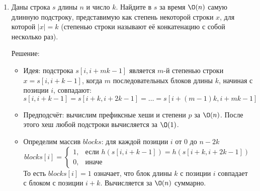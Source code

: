 \begin{enumerate}
\begin{itemize}
\begin{enumerate}
        Стоимость одного вызова $\texttt{check}$: $\O(|s| + |t|) = \O(n)$.

        \item Если $\texttt{check}(L)$ возвращает \texttt{true}, ищем значение $L$ больше, иначе -- меньше.
      \end{enumerate}

      \item Сложность по времени:
      \begin{itemize}
        \item Предподсчёт хешей: $\O(n)$
        \item Бинарный поиск: $\O(\log n)$ итераций, каждая за $\O(n)$
      \end{itemize}

      Итого: $\O(n \log n)$

      \item Сложность по памяти:
      \begin{itemize}
        \item Префиксные хеши и степени: $\O(n)$
        \item Хеш-таблица: $\O(n)$
      \end{itemize}

      Итого: $\O(n)$
      
    \end{itemize}

  \item
    Даны строка $s$ длины $n$ и число $k$. Найдите в $s$ за время $\O(n)$ самую длинную подстроку,
    представимую как степень  некоторой строки $x$, для которой $|x| = k$ (степенью строки
    называют её конкатенацию с собой несколько раз).

    Решение:

    \begin{itemize}
      \item Идея: подстрока $s[i, i + mk - 1]$ является $m$-й степенью строки $x = s[i, i+k-1]$,
      когда $m$ последовательных блоков длины $k$, начиная с позиции $i$, совпадают:
      $$s[i, i+k-1] = s[i+k, i+2k-1] = \ldots = s[i+(m-1)k, i+mk-1]$$

      \item Предподсчёт: вычислим префиксные хеши и степени $p$ за $\O(n)$.
      После этого хеш любой подстроки вычисляется за $\O(1)$.

      \item Определим массив $blocks$: для каждой позиции $i$ от $0$ до $n - 2k$
      $$blocks[i] = \begin{cases} 1, & \text{если } h(s[i, i+k-1]) = h(s[i+k, i+2k-1]) \\ 0, & \text{иначе} \end{cases}$$
      То есть $blocks[i] = 1$ означает, что блок длины $k$ с позиции $i$ совпадает с блоком с позиции $i + k$.
      Вычисляется за $\O(n)$ суммарно.


\end{itemize}
\end{enumerate}
